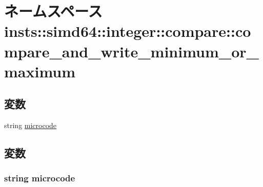 \hypertarget{namespaceinsts_1_1simd64_1_1integer_1_1compare_1_1compare__and__write__minimum__or__maximum}{
\section{ネームスペース insts::simd64::integer::compare::compare\_\-and\_\-write\_\-minimum\_\-or\_\-maximum}
\label{namespaceinsts_1_1simd64_1_1integer_1_1compare_1_1compare__and__write__minimum__or__maximum}
}
\subsection*{変数}
\begin{DoxyCompactItemize}
\item 
string \hyperlink{namespaceinsts_1_1simd64_1_1integer_1_1compare_1_1compare__and__write__minimum__or__maximum_a770f11a173e99389a8802f0107ed8f52}{microcode}
\end{DoxyCompactItemize}


\subsection{変数}
\hypertarget{namespaceinsts_1_1simd64_1_1integer_1_1compare_1_1compare__and__write__minimum__or__maximum_a770f11a173e99389a8802f0107ed8f52}{
\subsubsection[{microcode}]{\setlength{\rightskip}{0pt plus 5cm}string {\bf microcode}}}
\label{namespaceinsts_1_1simd64_1_1integer_1_1compare_1_1compare__and__write__minimum__or__maximum_a770f11a173e99389a8802f0107ed8f52}

